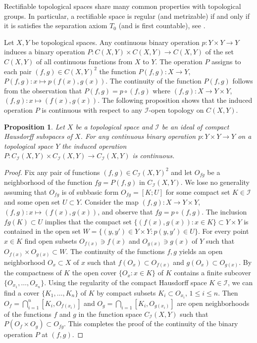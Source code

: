 \documentclass{amsart}
\newtheorem{proposition}[theorem]{Proposition}
\theoremstyle{definition}
\begin{document}
Rectifiable topological spaces share many common properties with topological groups. In particular, a rectifiable space is regular (and metrizable) if and only if it is satisfies the separation axiom $T_0$ (and is first countable), see \cite{Gul}.

Let $X,Y$ be topological spaces. Any continuous binary operation $p:Y\times Y\to Y$ induces a binary operation $P:C(X,Y)\times C(X,Y)\to C(X,Y)$ of the set $C(X,Y)$ of all continuous functions from $X$ to $Y$. The operation $P$ assigns to each pair $(f,g)\in C(X,Y)^2$ the function $P(f,g):X\to Y$, $P(f,g):x\mapsto p(f(x),g(x))$. The continuity of the function $P(f,g)$ follows from the observation that $P(f,g)=p\circ (f,g)$ where $(f,g):X\to Y\times Y$, $(f,g):x\mapsto (f(x),g(x))$. The following proposition shows that the induced operation $P$ is continuous with respect to any ${\mathcal I}$-open topology on $C(X,Y)$.

\begin{proposition}\label{p:magmaC} Let $X$ be a topological space and ${\mathcal I}$ be an ideal of compact Hausdorff subspaces of $X$. For any continuous binary operation $p:Y\times Y\to Y$ on a topological space $Y$ the induced operation $P:C_{\mathcal I}(X,Y)\times C_{\mathcal I}(X,Y)\to C_{\mathcal I}(X,Y)$ is continuous.
\end{proposition}

\begin{proof} Fix any pair of functions $(f,g)\in C_{\mathcal I}(X,Y)^2$ and let $O_{fg}$ be a neighborhood of the function $fg=P(f,g)$ in $C_{\mathcal I}(X,Y)$. We lose no generality assuming that $O_{fg}$ is of subbasic form $O_{fg}=[K;U]$ for some compact set $K\in{\mathcal I}$ and some open set $U\subset Y$. Consider the map $(f,g):X\to Y\times Y$, $(f,g):x\mapsto (f(x),g(x))$, and observe that $fg=p\circ (f,g)$. The inclusion $fg(K)\subset U$ implies that the compact set $\{(f(x),g(x)):x\in K\}\subset Y\times Y$ is contained in the open set $W=\{(y,y')\in Y\times Y:p(y,y')\in U\}$. For every point $x\in K$ find open subsets $O_{f(x)}\ni f(x)$ and $O_{g(x)}\ni g(x)$ of $Y$ such that $O_{f(x)}\times O_{g(x)}\subset W$. The continuity of the functions $f,g$ yields an open neighborhood $O_x\subset X$ of $x$ such that $f(O_x)\subset O_{f(x)}$ and $g(O_x)\subset O_{g(x)}$. By the compactness of $K$ the open cover $\{O_x:x\in K\}$ of $K$ contains a finite subcover $\{O_{x_1},\dots,O_{x_n}\}$. Using the  regularity of the compact Hausdorff space $K\in{\mathcal I}$, we can find a cover $\{K_1,\dots,K_n\}$ of $K$ by compact subsets $K_i\subset O_{x_i}$, $1\le i\le n$. Then $O_f=\bigcap_{i=1}^n[K_i,O_{f(x_i)}]$ and $O_g=\bigcap_{i=1}[K_i,O_{g(x_i)}]$ are open neighborhoods of the functions $f$ and $g$ in the function space $C_{\mathcal I}(X,Y)$ such that $P(O_f\times O_g)\subset O_{fg}$. This completes the proof of the continuity of the binary operation $P$ at $(f,g)$.
\end{proof}
\end{document}
